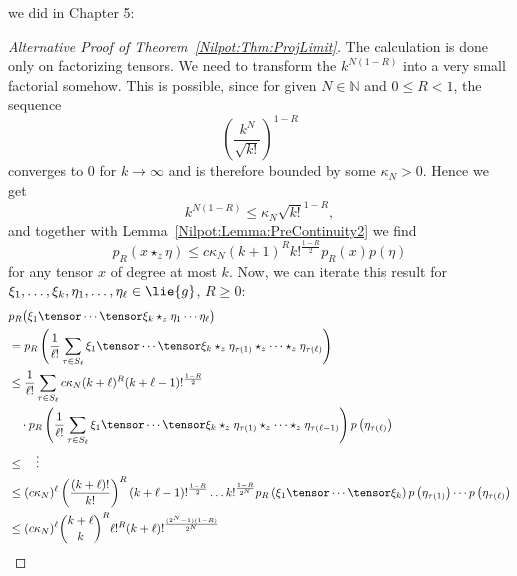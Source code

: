 we did in Chapter 5:
\begin{proof}[Alternative Proof of Theorem~\ref{Nilpot:Thm:ProjLimit}]
	The calculation is done only on factorizing tensors. We need to 
	transform the $k^{N(1-R)}$ into a very small factorial somehow. This is 
	possible, since for given $N \in \mathbb{N}$ and $0 \leq R < 1$, the 
	sequence
	\begin{equation*}
		\left( \frac{k^N}{\sqrt{k!}} \right)^{1-R}
	\end{equation*}
	converges to $0$ for $k \longrightarrow \infty$ and is therefore bounded 
	by some $\kappa_N > 0$. Hence we get
	\begin{equation*}
		k^{ N (1-R) } 
		\leq
		\kappa_N \sqrt{k!}^{1-R},
	\end{equation*}
	and together with Lemma~\ref{Nilpot:Lemma:PreContinuity2} we find
	\begin{equation*}
		p_R \left( x \star_z \eta \right)
		\leq
		c \kappa_N
		(k + 1)^R k!^{\frac{1-R}{2}} 
		p_R (x) p(\eta)
	\end{equation*}
	for any tensor $x$ of degree at most $k$. Now, we can iterate this result
	for $\xi_1, \ldots, \xi_k, \eta_1, \ldots, \eta_\ell 
	\in \lie{g}$, $R \geq 0$:
	\begin{align*}
		&
		p_R \big(
			\xi_1 \tensor \cdots \tensor \xi_k 
			\star_z 
			\eta_1 \cdots \eta_\ell
		\big)
		\\
		& =
		p_R \left(
			\frac{1}{\ell!}
			\sum\limits_{\tau \in S_\ell}
			\xi_1 \tensor \cdots \tensor  \xi_k 
			\star_z
			\eta_{\tau(1)} \star_z \cdots \star_z \eta_{\tau(\ell)}
		\right)
		\\
		& \leq
		\frac{1}{\ell!}
		\sum\limits_{\tau \in S_\ell}
		c \kappa_N
		(k + \ell)^R
		(k + \ell - 1)!^{\frac{1-R}{2}}
		\\
		& \quad 
		\cdot
		p_R \left(
			\frac{1}{\ell!}
			\sum\limits_{\tau \in S_\ell}
			\xi_1 \tensor \cdots \tensor \xi_k 
			\star_z
			\eta_{\tau(1)} \star_z \cdots \star_z \eta_{\tau(\ell-1)}
		\right)
		p\left( \eta_{\tau(\ell)} \right)
		\\
		& \leq
		\quad \vdots
		\\
		& \leq
		(c \kappa_N)^{\ell}
		\left(
			\frac{(k + \ell)!}{k!}
		\right)^R
		(k + \ell - 1)!^{\frac{1-R}{2}}
		\ldots
		k!^{\frac{1-R}{2^N}}
		p_R \left( \xi_1 \tensor \cdots \tensor \xi_k \right)
		p\left( \eta_{\tau(1)} \right)
		\cdots
		p\left( \eta_{\tau(\ell)} \right)
		\\
		& \leq
		(c \kappa_N)^{\ell}
		\binom{k + \ell}{k}^R 
		\ell!^R
		(k + \ell)!^{\frac{(2^N - 1) (1-R)}{2^N} }

\end{align*}
\end{proof}
